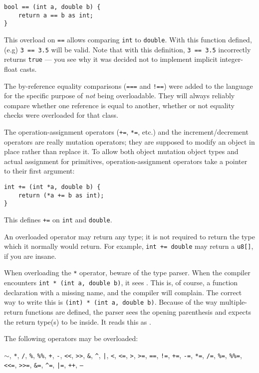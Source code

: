 \documentclass{article}
\begin{document}
\begin{verbatim}
bool == (int a, double b) {
    return a == b as int;
}
\end{verbatim}

This overload on \texttt{==} allows comparing \texttt{int} to \texttt{double}.
With this function defined, (e.g) \texttt{3 == 3.5} will be valid. Note that
with this definition, \texttt{3 == 3.5} incorrectly returns \texttt{true}
--- you see why it was decided not to implement implicit integer-float casts.

The by-reference equality comparisons (\texttt{===} and \texttt{!==}) were
added to the language for the specific purpose of \emph{not} being
overloadable. They will always reliably compare whether one reference is equal
to another, whether or not equality checks were overloaded for that class.

The operation-assignment operators (\texttt{+=}, \texttt{*=}, etc.) and the
increment/decrement operators are really
mutation operators; they are supposed to modify an object in place rather than
replace it. To allow both object mutation object types and actual assignment
for primitives, operation-assignment operators take a pointer to their first
argument:

\begin{verbatim}
int += (int *a, double b) {
    return (*a += b as int);
}
\end{verbatim}

This defines \texttt{+=} on \texttt{int} and \texttt{double}.

An overloaded operator may return any type; it is not required to return the
type which it normally would return. For example, \texttt{int += double}
may return a \texttt{u8[]}, if you are insane.

When overloading the \texttt{*} operator, beware of the type parser.
When the compiler encounters \texttt{int~*~(int~a,~double~b)}, it sees
 . This is, of course,
a function declaration with a missing name, and the compiler will complain. The
correct way to write this is \texttt{(int)~*~(int~a,~double~b)}. Because of the
way multiple-return functions are defined, the parser sees the opening
parenthesis and expects the return type(s) to be inside. It reads this as
 \fbox{*} .

The following operators may be overloaded:

\texttt{$\sim$},
\texttt{*},
\texttt{/},
\texttt{\%},
\texttt{\%\%},
\texttt{+},
\texttt{-},
\texttt{<<},
\texttt{>>},
\texttt{\&},
\texttt{\^},
\texttt{|},
\texttt{<},
\texttt{<=},
\texttt{>},
\texttt{>=},
\texttt{==},
\texttt{!=},
\texttt{+=},
\texttt{-=},
\texttt{*=},
\texttt{/=},
\texttt{\%=},
\texttt{\%\%=},
\texttt{<<=},
\texttt{>>=},
\texttt{\&=},
\texttt{\^{}=},
\texttt{|=},
\texttt{++},
\texttt{--}
\end{document}

